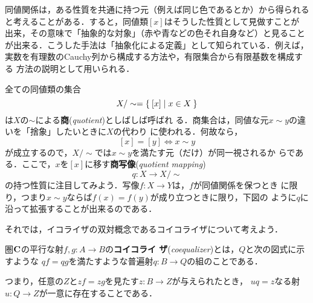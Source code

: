 同値関係は，ある性質を共通に持つ元（例えば同じ色であるとか）から得られる
と考えることがある．すると，同値類$[x]$はそうした性質として見做すことが
出来，その意味で「抽象的な対象」（赤や青などの色それ自身など）と見ること
が出来る．こうした手法は「抽象化による定義」として知られている．例えば，
実数を有理数のCauchy列から構成する方法や，有限集合から有限基数を構成する
方法の説明として用いられる．

全ての同値類の集合
\[
 X/\sim = \Set{[x] | x \in X}
\]
は$X$の$\sim$による{\bfseries 商}({\itshape quotient})としばしば呼ばれ
る．商集合は，同値な元$x \sim y$の違いを「捨象」したいときに$X$の代わり
に使われる．何故なら，
\[
 [x] = [y] \iff x \sim y
\]
が成立するので，$X/\sim$では$x \sim y$を満たす元（だけ）が同一視されるか
らである．ここで，$x$を$[x]$に移す{\bfseries 商写像}({\itshape quotient
mapping})
\[
 q: X \to X / \sim
\]
の持つ性質に注目してみよう．写像$f: X \to Y$は，$f$が同値関係を保つとき
に限り，つまり$x \sim y$ならば$f(x) = f(y)$が成り立つときに限り，下図の
ように$q$に沿って拡張することが出来るのである．
\begin{center}
\end{center}

それでは，イコライザの双対概念であるコイコライザについて考えよう．

\begin{definition}
 圏${\bf C}$の平行な射$f, g: A \to B$の{\bfseries コイコライ
 ザ}({\itshape coequalizer})とは，$Q$と次の図式に示すような
 $qf = qg$を満たすような普遍射$q: B \to Q$の組のことである．

 \begin{center}
 \end{center}
 つまり，任意の$Z$と$zf = zg$を見たす$z: B \to Z$が与えられたとき，
 $uq = z$なる射$u: Q \to Z$が一意に存在することである．
\end{definition}

